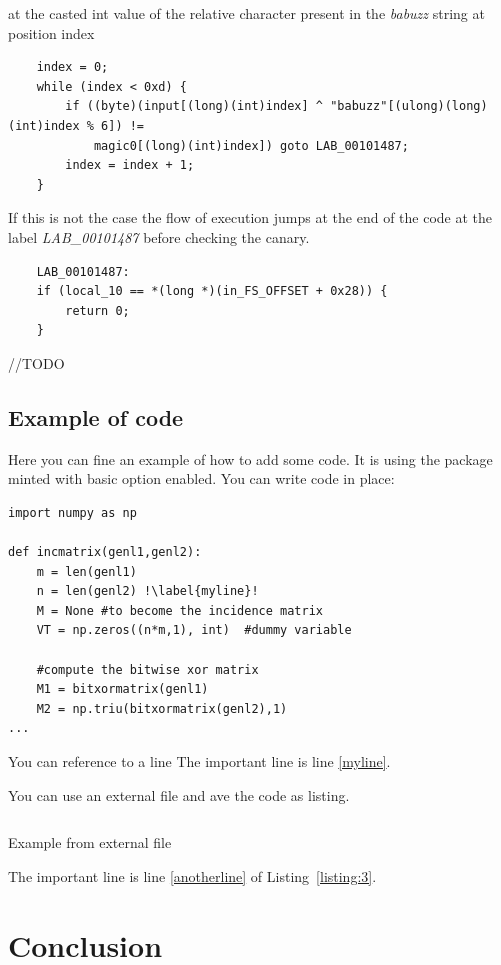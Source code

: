 \documentclass{article}
\begin{document}
at the casted int value of the relative character present in the \textit{babuzz} string at position index %
\begin{verbatim}
    index = 0;
    while (index < 0xd) {
        if ((byte)(input[(long)(int)index] ^ "babuzz"[(ulong)(long)(int)index % 6]) !=
            magic0[(long)(int)index]) goto LAB_00101487;
        index = index + 1;
    }
\end{verbatim}
If this is not the case the flow of execution jumps at the end of the code at the label \textit{LAB\_00101487} before checking the canary.
\begin{verbatim}
    LAB_00101487:
    if (local_10 == *(long *)(in_FS_OFFSET + 0x28)) {
        return 0;
    }
\end{verbatim}
//TODO



\subsection{Example of code}
Here you can fine an example of how to add some code. It is using the package minted with basic option enabled.
You can write code in place:
\begin{verbatim}
import numpy as np
    
def incmatrix(genl1,genl2):
    m = len(genl1)
    n = len(genl2) !\label{myline}!
    M = None #to become the incidence matrix
    VT = np.zeros((n*m,1), int)  #dummy variable
    
    #compute the bitwise xor matrix
    M1 = bitxormatrix(genl1)
    M2 = np.triu(bitxormatrix(genl2),1) 
...
\end{verbatim}
You can reference to a line
The important line is line \ref{myline}.

You can use an external file and ave the code as listing.
\begin{listing}[ht]
\inputminted[linenos, bgcolor=black, escapeinside=!!]{python}{x.py}
\caption{Example from external file}
\label{listing:3}
\end{listing}
 
The important line is line \ref{anotherline} of Listing~\ref{listing:3}.

\section{Conclusion}




\end{document}
